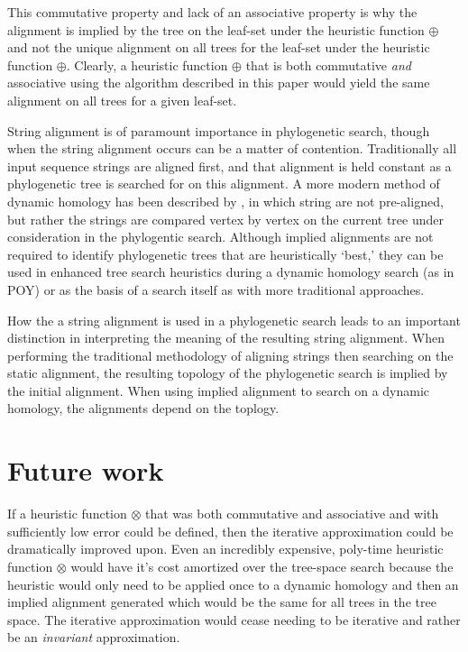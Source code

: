 \documentclass[11pt]{article}
\begin{document}
This commutative property and lack of an associative property is why the alignment is implied by the tree on the leaf-set under the heuristic function $\oplus$ and not the unique alignment on all trees for the leaf-set under the heuristic function $\oplus$. 
Clearly, a heuristic function $\oplus$ that is both commutative \emph{and} associative using the algorithm described in this paper would yield the same alignment on all trees for a given leaf-set.

String alignment is of paramount importance in phylogenetic search, though when the string alignment occurs can be a matter of contention.
Traditionally all input sequence strings are aligned first, and that alignment is held constant as a phylogenetic tree is searched for on this alignment.
A more modern method of dynamic homology has been described by \citep{Wheeler1996}, in which string are not pre-aligned, but rather the strings are compared vertex by vertex on the current tree under consideration in the phylogentic search.  Although implied alignments are not required to identify phylogenetic trees that are heuristically `best,' they can be used in enhanced tree search heuristics during a dynamic homology search (as in POY) or as the basis of a search itself as with more traditional approaches.

How the a string alignment is used in a phylogenetic search leads to an important distinction in interpreting the meaning of the resulting string alignment.
When performing the traditional methodology of aligning strings then searching on the static alignment, the resulting topology of the phylogenetic search is implied by the initial alignment.
When using implied alignment to search on a dynamic homology, the alignments depend on the toplogy.




\section{Future work}
If a heuristic function $\otimes$ that was both commutative and associative and with sufficiently low error could be defined, then the iterative approximation \citep{Wheeler2003a} could be dramatically improved upon. 
Even an incredibly expensive, poly-time heuristic function $\otimes$ would have it's cost amortized over the tree-space search because the heuristic would only need to be applied once to a dynamic homology and then an implied alignment generated which would be the same for all trees in the tree space. 
The iterative approximation would cease needing to be iterative and rather be an \emph{invariant} approximation.
\end{document}
